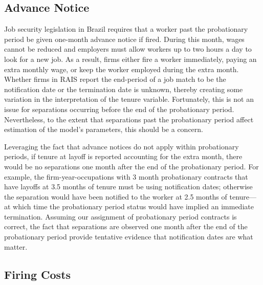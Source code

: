 \documentclass[12pt]{article}
\begin{document}
\subsection{Advance Notice} \label{advance_notice}

Job security legislation in Brazil requires that a worker past the probationary period be given one-month advance notice if fired.
During this month, wages cannot be reduced and employers must allow workers up to two hours a day to look for a new job.
As a result, firms either fire a worker immediately, paying an extra monthly wage, or keep the worker employed during the extra month.
Whether firms in RAIS report the end-period of a job match to be the notification date or the termination date is unknown, thereby creating some variation in the interpretation of the tenure variable.
Fortunately, this is not an issue for separations occurring before the end of the probationary period.
Nevertheless, to the extent that separations past the probationary period affect estimation of the model's parameters, this should be a concern.

Leveraging the fact that advance notices do not apply within probationary periods, if tenure at layoff is reported accounting for the extra month, there would be no separations one month after the end of the probationary period.
For example, the firm-year-occupations with 3 month probationary contracts that have layoffs at 3.5 months of tenure must be using notification dates; otherwise the separation would have been notified to the worker at 2.5 months of tenure---at which time the probationary period status would have implied an immediate termination.
Assuming our assignment of probationary period contracts is correct, the fact that separations are observed one month after the end of the probationary period provide tentative evidence that notification dates are what matter.


\subsection{Firing Costs} \label{firing_costs}
\end{document}
